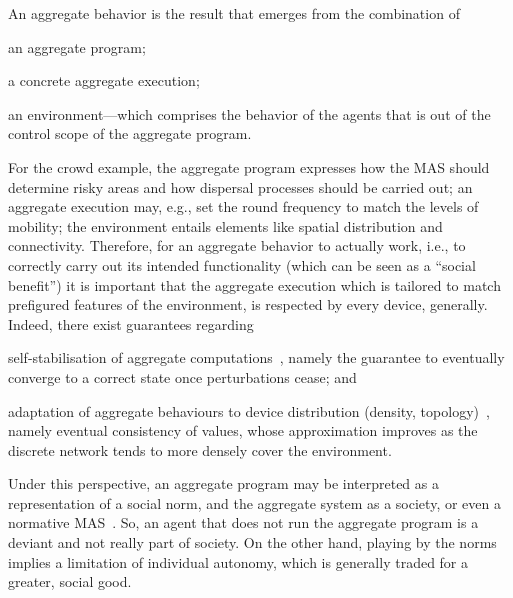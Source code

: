 \documentclass[jsan,article,accept,moreauthors,pdftex]{Definitions/mdpi}
\begin{document}
\begin{paracol}{2}
\switchcolumn



An {aggregate behavior} is the result
 that emerges from the combination of
\begin{inlinelist}
\item an aggregate program;
\item a concrete aggregate execution;
\item an environment---which comprises the behavior of the agents
 that is out of the control scope of the aggregate program.
\end{inlinelist}
%
For the crowd example,
 the aggregate program expresses how the MAS 
 should determine risky areas and how dispersal processes should be carried out; an aggregate execution may, e.g., set the round frequency to match the levels of mobility; the environment entails elements like spatial distribution and connectivity.
%
Therefore, for an aggregate behavior to actually work, i.e.,
 to correctly carry out its intended functionality
 (which can be seen as a ``social benefit'')
 it is important that the aggregate execution
 which is tailored to match prefigured features of the environment,
 is respected by every device, generally.
%
Indeed, there exist guarantees 
 regarding 
\begin{inlinelist}
\item {self-stabilisation} of aggregate computations~\cite{DBLP:journals/tomacs/ViroliABDP18}, namely 
 the guarantee to eventually converge to a correct state
 once perturbations cease; and 
\item {adaptation of aggregate behaviours to device distribution (density, topology)}~\cite{DBLP:journals/taas/BealVPD17},
 namely eventual consistency of values, 
 whose approximation improves as the discrete network
 tends to more densely cover the environment.
\end{inlinelist}
%
Under this perspective,
 an aggregate program may be interpreted
 as a representation of a {social norm},
 and the aggregate system as a {society}, or even a {normative MAS}~\cite{DBLP:journals/jasss/HollanderW11}.
%
So, an agent that does not run the aggregate program
 is a {deviant} and not really part of society.
%
On the other hand, playing by the norms
 implies a {limitation of individual autonomy},
 which is generally traded for a greater, social good.

\end{paracol}
\end{document}
